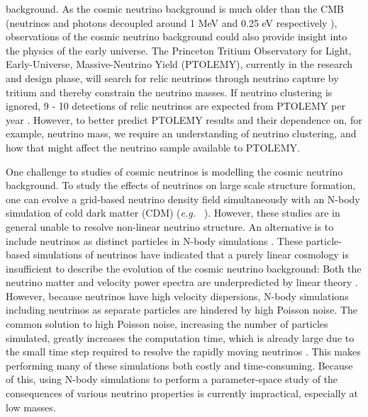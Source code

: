 \documentclass[twocolumn,superscriptaddress,prd]{revtex4}
\newcommand{\eg}{\textit{e.g.}~}
\newcommand{\ptolemy}{PTOLEMY }
\newcommand{\ptolemyns}{PTOLEMY}
\begin{document}
background.  As the cosmic neutrino background is much older than the
CMB (neutrinos and photons decoupled around 1 MeV
and 0.25 eV respectively \citep{schneider}),
observations of the cosmic neutrino background could also provide
insight into the physics of the early universe.
The Princeton Tritium Observatory for Light, Early-Universe,
Massive-Neutrino Yield (\ptolemyns), currently in the research and design
phase, will search for relic neutrinos through neutrino capture by
tritium and thereby constrain the
neutrino masses.  
If neutrino
clustering is ignored, 9 - 10 detections of relic neutrinos are
expected from \ptolemy per year \citep{ptolemy}.  However, to better predict \ptolemy
results and their dependence on, for example, neutrino mass,
we require an understanding of neutrino clustering, and how that might
affect the neutrino sample available to \ptolemyns.



One challenge to studies of cosmic neutrinos is
modelling the cosmic neutrino background.  
To study the effects of neutrinos on large scale structure formation,
one can evolve
a grid-based neutrino
density field simultaneously with an N-body simulation of 
cold dark matter (CDM) (\eg
\cite{brandbyge08}).  However, these studies are in general
unable to resolve non-linear neutrino structure.
An alternative is to include neutrinos as
distinct particles in N-body simulations \citep{bird12,inman15}.
These particle-based simulations of neutrinos have
indicated that a purely linear cosmology is insufficient to describe
the evolution of the cosmic neutrino background: Both the neutrino
matter 
and velocity power spectra are underpredicted by linear
  theory \citep{brandbyge09,inman15}.
However, because neutrinos have high
velocity dispersions, N-body simulations including neutrinos as separate
particles are hindered by high Poisson noise. The
common solution to high Poisson noise,  increasing the
number 
of particles simulated, greatly increases the computation
time, which is already large due to the small time
step required to resolve the rapidly moving neutrinos \citep{brandbyge082,brandbyge08,brandbyge09}.  This
makes performing many of these simulations both costly and
time-consuming. 
 Because of this, using N-body simulations to perform a parameter-space 
study of the consequences of
various neutrino properties is currently
impractical, especially at low masses. 
\end{document}
